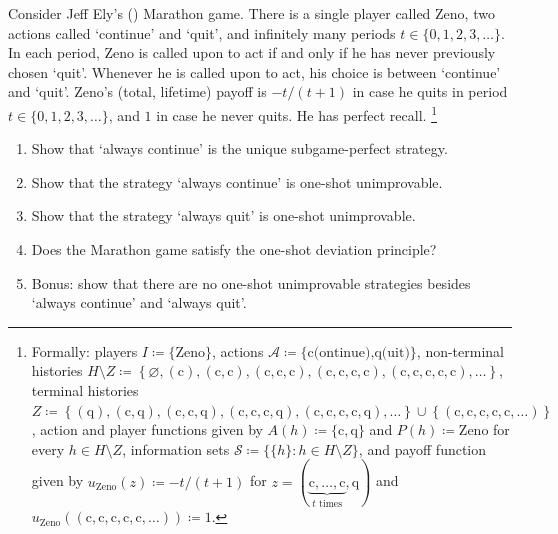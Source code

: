 \begin{exercise}
	\label{exercise:marathon}
	Consider Jeff Ely's (\citeyear{Ely2017online}) Marathon game. There is a single player called Zeno, two actions called `continue' and `quit', and infinitely many periods $t \in \{0,1,2,3,\dots\}$. In each period, Zeno is called upon to act if and only if he has never previously chosen `quit'. Whenever he is called upon to act, his choice is between `continue' and `quit'. Zeno's (total, lifetime) payoff is $-t/(t+1)$ in case he quits in period $t \in \{0,1,2,3,\dots\}$, and $1$ in case he never quits. He has perfect recall.%
		\footnote{Formally:
		players $I \coloneqq \{\text{Zeno}\}$,
		actions $\mathcal{A} \coloneqq \{ \text{c(ontinue),q(uit)} \}$,
		non-terminal histories $H \setminus Z \coloneqq \left\{ \varnothing, (\text{c}), (\text{c},\text{c}), (\text{c},\text{c},\text{c}), (\text{c},\text{c},\text{c},\text{c}), (\text{c},\text{c},\text{c},\text{c},\text{c}), \dots \right\}$, 
		terminal histories $Z \coloneqq \left\{ (\text{q}), (\text{c},\text{q}), (\text{c},\text{c},\text{q}), (\text{c},\text{c},\text{c},\text{q}), (\text{c},\text{c},\text{c},\text{c},\text{q}), \dots \right\} \cup \left\{ (\text{c},\text{c},\text{c},\text{c},\text{c},\dots) \right\}$,
		action and player functions given by $A(h) \coloneqq \{ \text{c}, \text{q} \}$ and $P(h) \coloneqq \text{Zeno}$ for every $h \in H \setminus Z$,
		information sets $\mathcal{S} \coloneqq \{ \{h\} : h \in H \setminus Z \}$,
		and payoff function given by $u_{\text{Zeno}}(z) \coloneqq -t/(t+1)$ for $z = (\underbrace{\text{c},\dots,\text{c}}_{\text{$t$ times}},\text{q})$ and $u_{\text{Zeno}}((\text{c},\text{c},\text{c},\text{c},\text{c},\dots)) \coloneqq 1$.}

	\begin{enumerate}[label=(\alph*)]

		\item Show that `always continue' is the unique subgame-perfect strategy.

		\item Show that the strategy `always continue' is one-shot unimprovable.

		\item Show that the strategy `always quit' is one-shot unimprovable.

		\item Does the Marathon game satisfy the one-shot deviation principle?

		\item Bonus: show that there are no one-shot unimprovable strategies besides `always continue' and `always quit'.
	
	\end{enumerate}
\end{exercise}

